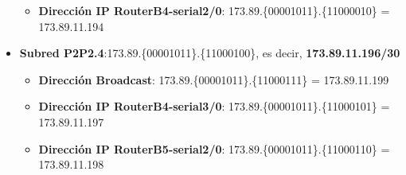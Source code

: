 \begin{itemize}
\begin{itemize}
			\item{\textbf{Dirección IP RouterB4-serial2/0}}: 173.89.\{\textcolor{azul}{000010}\textcolor{rojo}{11}\}.\{\textcolor{rojo}{110000}10\} = 173.89.11.194
		\end{itemize}
	\item{\textbf{Subred P2P2.4}:}173.89.\{\textcolor{azul}{000010}\textcolor{rojo}{11}\}.\{\textcolor{rojo}{110001}00\}, es decir, \textbf{173.89.11.196/30}
		\begin{itemize}
			\item{\textbf{Dirección Broadcast}}: 173.89.\{\textcolor{azul}{000010}\textcolor{rojo}{11}\}.\{\textcolor{rojo}{110001}11\} = 173.89.11.199
			\item{\textbf{Dirección IP RouterB4-serial3/0}}: 173.89.\{\textcolor{azul}{000010}\textcolor{rojo}{11}\}.\{\textcolor{rojo}{110001}01\} = 173.89.11.197
			\item{\textbf{Dirección IP RouterB5-serial2/0}}: 173.89.\{\textcolor{azul}{000010}\textcolor{rojo}{11}\}.\{\textcolor{rojo}{110001}10\} = 173.89.11.198
		\end{itemize}
\end{itemize}







